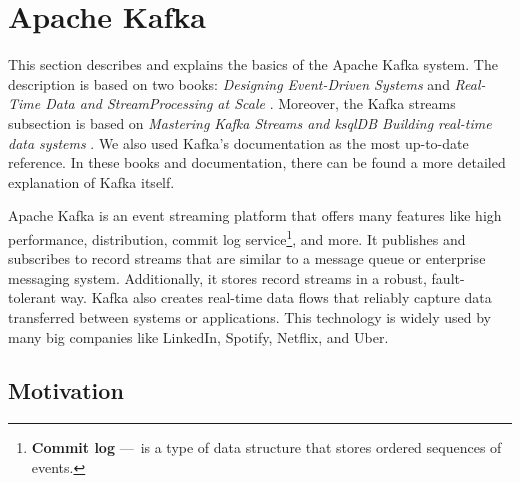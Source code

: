 \section{Apache Kafka}
\label{02:sec:title}

This section describes and explains the basics of the Apache Kafka system. The description is based on two books: \emph{Designing Event-Driven Systems} \cite{apacheKafkaDesignDistributedSystems} and \emph{Real-Time Data and StreamProcessing at Scale} \cite{apacheKafkaDefinitiveGuide}. Moreover, the Kafka streams subsection is based on \emph{Mastering Kafka Streams and ksqlDB Building real-time data systems} \cite{kafkaStreamsBook}. We also used Kafka's documentation \cite{kafkaDocumentation} as the most up-to-date reference. In these books and documentation, there can be found a more detailed explanation of Kafka itself.

Apache Kafka is an event streaming platform that offers many features like high performance, distribution, commit log service\footnote{\textbf{Commit log} 
---\ is a type of data structure that stores ordered sequences of events.}, and more. It publishes and subscribes to record streams that are similar to a message queue or enterprise messaging system. Additionally, it stores record streams in a robust, fault-tolerant way. Kafka also creates real-time data flows that reliably capture data transferred between systems or applications. This technology is widely used by many big companies like LinkedIn, Spotify, Netflix, and Uber.
\subsection{Motivation \cite{02-bachelor-thesis}}
\label{kafka:motivation}

